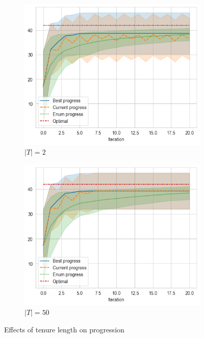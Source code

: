 \begin{figure}[ht]
    \centering
    \hfill
    \begin{subfigure}{0.45\textwidth}
        \includegraphics[width=\textwidth]{../images/p5/tenure5.png}
        \caption{\(|T| = 2\)}
    \end{subfigure}
    \hfill
    \begin{subfigure}{0.45\textwidth}
        \includegraphics[width=\textwidth]{../images/p5/tenure50.png}
        \caption{\(|T| = 50\)}
    \end{subfigure}
    \hfill

    \caption{Effects of tenure length on progression}
    \label{fig:p5-tenure}
\end{figure}

